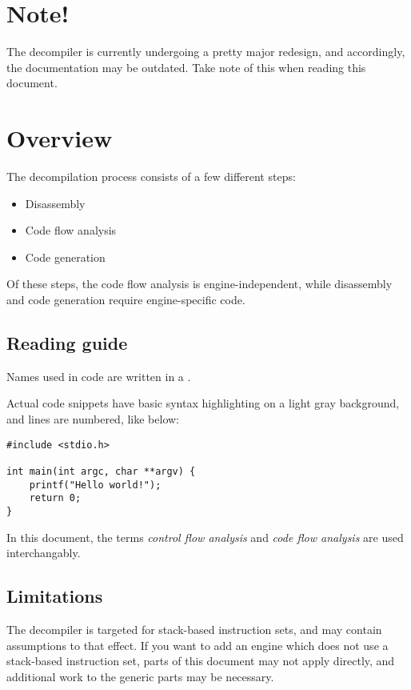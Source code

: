 \section{Note!}
The decompiler is currently undergoing a pretty major redesign, and accordingly, the documentation may be outdated. Take note of this when reading this document.

\section{Overview}
The decompilation process consists of a few different steps:

\begin{itemize}
\item Disassembly
\item Code flow analysis
\item Code generation
\end{itemize}

Of these steps, the code flow analysis is engine-independent, while disassembly and code generation require engine-specific code.

\subsection{Reading guide}
Names used in code are written in a .

Actual code snippets have basic syntax highlighting on a light gray background, and lines are numbered, like below:

\begin{C++}
\begin{lstlisting}
#include <stdio.h>

int main(int argc, char **argv) {
	printf("Hello world!");
	return 0;
}
\end{lstlisting}
\end{C++}

In this document, the terms \emph{control flow analysis} and \emph{code flow analysis} are used interchangably.

\subsection{Limitations}
The decompiler is targeted for stack-based instruction sets, and may contain assumptions to that effect. If you want to add an engine which does not use a stack-based instruction set, parts of this document may not apply directly, and additional work to the generic parts may be necessary.
